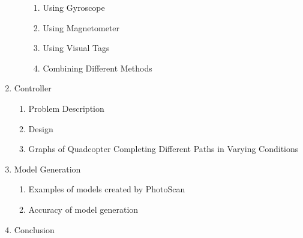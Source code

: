 \documentclass[pageno]{jpaper}
\begin{document}
\begin{enumerate}
\begin{enumerate}
\begin{enumerate}
				\item Using Gyroscope
				\item Using Magnetometer
				\item Using Visual Tags
				\item Combining Different Methods
			\end{enumerate}
	\end{enumerate}
\item Controller
	\begin{enumerate}
		\item Problem Description
		\item Design
		\item Graphs of Quadcopter Completing Different Paths in Varying Conditions
	\end{enumerate}
\item Model Generation
	\begin{enumerate}
		\item Examples of models created by PhotoScan
		\item Accuracy of model generation
	\end{enumerate}
\item Conclusion
\end{enumerate}
\end{document}
